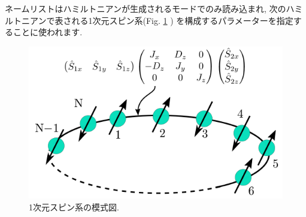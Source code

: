 \documentclass[letterpaper,10pt,dvipdfmx,openany]{sphinxmanual}
\begin{document}
ネームリストはハミルトニアンが生成されるモードでのみ読み込まれ,
次のハミルトニアンで表される1次元スピン系(Fig. \ref{shiftk_format_ja:spin} )
を構成するパラメーターを指定することに使われます.
\begin{figure}[htbp]
\centering
\capstart

\includegraphics{spin.png}
\caption{1次元スピン系の模式図.}\label{shiftk_format_ja:spin}\end{figure}
\end{document}
